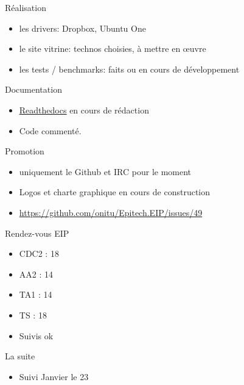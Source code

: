 \documentclass{beamer}
\begin{document}
\begin{frame}{Réalisation}
\begin{itemize}
  \item les drivers: Dropbox, Ubuntu One
  \item le site vitrine: technos choisies, à mettre en œuvre
  \item les tests / benchmarks: faits ou en cours de développement
\end{itemize}
\end{frame}

\begin{frame}{Documentation}
\begin{itemize}
  \item \underline{\hyperlink{http://onitu.readthedocs.org/en/latest/}{Readthedocs}} en cours de rédaction
  \item Code commenté.
\end{itemize}
\end{frame}

\begin{frame}{Promotion}
\begin{itemize}
  \item uniquement le Github et IRC pour le moment
  \item Logos et charte graphique en cours de construction
  \item \hyperlink{https://github.com/onitu/Epitech.EIP/issues/49}{https://github.com/onitu/Epitech.EIP/issues/49}
\end{itemize}
\end{frame}

\begin{frame}{Rendez-vous EIP}
\begin{itemize}
  \item CDC2 : 18
  \item AA2  : 14
  \item TA1  : 14
  \item TS   : 18
  \item Suivis ok
\end{itemize}
\end{frame}

\begin{frame}{La suite}
\begin{itemize}
  \item Suivi Janvier le 23
\end{itemize}
\end{frame}
\end{document}
